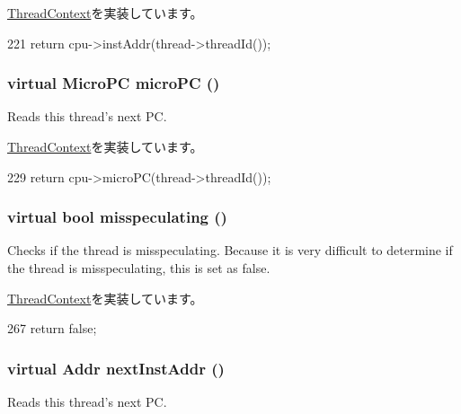 \hyperlink{classThreadContext_a899644592f5027a7951cfd87b1c548a2}{ThreadContext}を実装しています。


\begin{DoxyCode}
221     { return cpu->instAddr(thread->threadId()); }
\end{DoxyCode}
\hypertarget{classO3ThreadContext_ae2a795211f2911e8b1f66bab373b6ac2}{
\subsubsection[{microPC}]{\setlength{\rightskip}{0pt plus 5cm}virtual {\bf MicroPC} microPC ()}}
\label{classO3ThreadContext_ae2a795211f2911e8b1f66bab373b6ac2}
Reads this thread's next PC. 

\hyperlink{classThreadContext_a263dbcf93ece0a30ea54a77fdb2e3926}{ThreadContext}を実装しています。


\begin{DoxyCode}
229     { return cpu->microPC(thread->threadId()); }
\end{DoxyCode}
\hypertarget{classO3ThreadContext_a32d306133270d25950961c23f6be76e1}{
\subsubsection[{misspeculating}]{\setlength{\rightskip}{0pt plus 5cm}virtual bool misspeculating ()}}
\label{classO3ThreadContext_a32d306133270d25950961c23f6be76e1}
Checks if the thread is misspeculating. Because it is very difficult to determine if the thread is misspeculating, this is set as false. 

\hyperlink{classThreadContext_a6b21c2b589ae3065643986e1c3e5f6fa}{ThreadContext}を実装しています。


\begin{DoxyCode}
267 { return false; }
\end{DoxyCode}
\hypertarget{classO3ThreadContext_a4eb5bb6ecd5d32c0920ed2dce19036a0}{
\subsubsection[{nextInstAddr}]{\setlength{\rightskip}{0pt plus 5cm}virtual {\bf Addr} nextInstAddr ()}}
\label{classO3ThreadContext_a4eb5bb6ecd5d32c0920ed2dce19036a0}
Reads this thread's next PC. 

